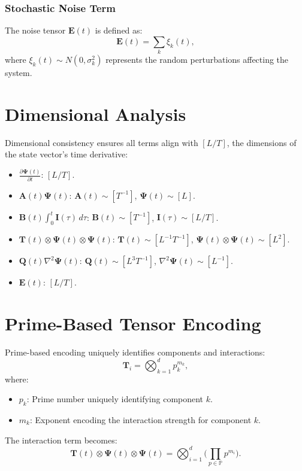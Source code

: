 \documentclass{article}
\theoremstyle{plain}
\begin{document}
\subsubsection{Stochastic Noise Term}
The noise tensor \(\bm{E}(t)\) is defined as:
\begin{equation}
\bm{E}(t) = \sum_k \xi_k(t),
\end{equation}
where \(\xi_k(t) \sim N(0, \sigma_k^2)\) represents the random perturbations affecting the system.

\section{Dimensional Analysis}
Dimensional consistency ensures all terms align with \([L/T]\), the dimensions of the state vector’s time derivative:
\begin{itemize}
    \item \(\frac{\partial \bm{\Psi}(t)}{\partial t}\): \([L/T]\).
    \item \(\bm{A}(t) \bm{\Psi}(t)\): \(\bm{A}(t) \sim [T^{-1}]\), \(\bm{\Psi}(t) \sim [L]\).
    \item \(\bm{B}(t) \int_0^t \bm{I}(\tau) \, d\tau\): \(\bm{B}(t) \sim [T^{-1}]\), \(\bm{I}(\tau) \sim [L/T]\).
    \item \(\bm{T}(t) \otimes \bm{\Psi}(t) \otimes \bm{\Psi}(t)\): \(\bm{T}(t) \sim [L^{-1} T^{-1}]\), \(\bm{\Psi}(t) \otimes \bm{\Psi}(t) \sim [L^2]\).
    \item \(\bm{Q}(t) \nabla^2 \bm{\Psi}(t)\): \(\bm{Q}(t) \sim [L^3 T^{-1}]\), \(\nabla^2 \bm{\Psi}(t) \sim [L^{-1}]\).
    \item \(\bm{E}(t)\): \([L/T]\).
\end{itemize}

\section{Prime-Based Tensor Encoding}
Prime-based encoding uniquely identifies components and interactions:
\begin{equation}
\bm{T}_i = \bigotimes_{k=1}^d p_k^{m_k},
\end{equation}
where:
\begin{itemize}
    \item \(p_k\): Prime number uniquely identifying component \(k\).
    \item \(m_k\): Exponent encoding the interaction strength for component \(k\).
\end{itemize}
The interaction term becomes:
\begin{equation}
\bm{T}(t) \otimes \bm{\Psi}(t) \otimes \bm{\Psi}(t) = \bigotimes_{i=1}^d \bigg( \prod_{p \in \mathbb{P}} p^{m_i} \bigg).
\end{equation}
\end{document}
